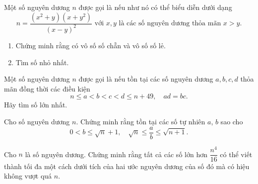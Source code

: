 \begin{btt}
Một số nguyên dương $n$ được gọi là  nếu như nó có thể biểu diễn dưới dạng
$$n=\dfrac{\left(x^{2}+y\right)\left(x+y^{2}\right)}{(x-y)^{2}} \text{ với } x,y \text{ là các số nguyên dương thỏa mãn }x>y.$$ 
\begin{enumerate}[a,]
    \item Chứng minh rằng có vô số số  chẵn và vô số số  lẻ.
    \item Tìm số  nhỏ nhất.
\end{enumerate}
\end{btt}

\begin{btt}
Một số nguyên dương $n$ được gọi là  nếu tồn tại các số nguyên dương $a,b,c,d$ thỏa mãn đồng thời các điều kiện
$$n\le a<b<c<d\le n+49,\quad ad=bc.$$
Hãy tìm số  lớn nhất.
\end{btt}

\begin{btt}
Cho số nguyên dương $n$. Chứng minh rằng tồn tại các số tự nhiên $a$, $b$ sao cho $$0<b\leq\sqrt{n}+1,\quad \sqrt{n}\leq\dfrac{a}{b}\leq\sqrt{n+1}.$$
\end{btt}

\begin{btt}
Cho $n$ là số nguyên dương. Chứng minh rằng tất cả các số lớn hơn $\dfrac{n^4}{16}$ có thể viết thành tối đa một cách dưới tích của hai ước nguyên dương của số đó mà có hiệu không vượt quá $n.$
\end{btt}


